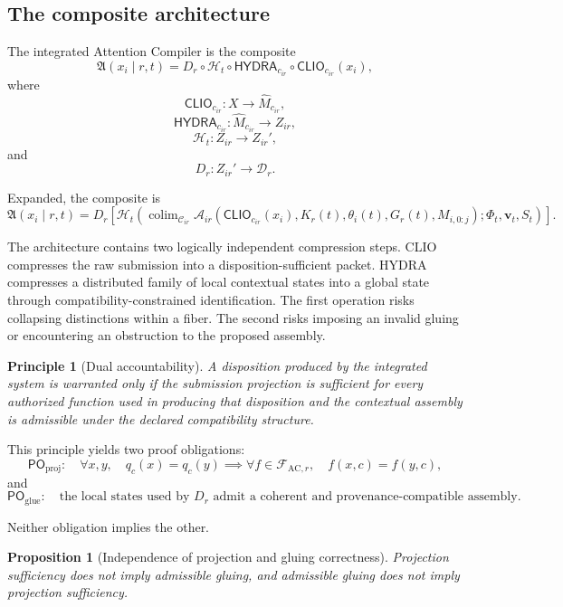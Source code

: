 \documentclass[11pt]{article}
\newtheorem{proposition}[definition]{Proposition}
\newtheorem{principle}[definition]{Principle}
\theoremstyle{definition}
\DeclareMathOperator{\colim}{colim}
\newcommand{\F}{\mathcal{F}}
\newcommand{\C}{\mathcal{C}}
\newcommand{\A}{\mathcal{A}}
\newcommand{\D}{\mathcal{D}}
\newcommand{\Hh}{\mathcal{H}}
\newcommand{\FieldPhi}{\Phi}
\newcommand{\FieldV}{\mathbf{v}}
\newcommand{\FieldS}{S}
\newcommand{\AC}{\mathfrak{A}}
\newcommand{\CLIO}{\mathsf{CLIO}}
\newcommand{\HYDRA}{\mathsf{HYDRA}}
\begin{document}
\subsection{The composite architecture}

The integrated Attention Compiler is the composite
\[
\AC(x_i\mid r,t)
=
D_r
\circ
\Hh_t
\circ
\HYDRA_{c_{ir}}
\circ
\CLIO_{c_{ir}}
(x_i),
\]
where
\[
\CLIO_{c_{ir}}:
X\to \widehat M_{c_{ir}},
\]
\[
\HYDRA_{c_{ir}}:
\widehat M_{c_{ir}}
\to Z_{ir},
\]
\[
\Hh_t:
Z_{ir}
\to Z_{ir}',
\]
and
\[
D_r:
Z_{ir}'
\to\D_r.
\]

Expanded, the composite is
\[
\AC(x_i\mid r,t)
=
D_r\!\left[
\Hh_t
\left(
\colim_{\C_{ir}}
\A_{ir}
\left(
\CLIO_{c_{ir}}(x_i),
K_r(t),
\theta_i(t),
G_r(t),
M_{i,0:j}
\right);
\FieldPhi_t,\FieldV_t,\FieldS_t
\right)
\right].
\]

The architecture contains two logically independent compression steps. CLIO compresses the raw submission into a disposition-sufficient packet. HYDRA compresses a distributed family of local contextual states into a global state through compatibility-constrained identification. The first operation risks collapsing distinctions within a fiber. The second risks imposing an invalid gluing or encountering an obstruction to the proposed assembly.

\begin{principle}[Dual accountability]
A disposition produced by the integrated system is warranted only if the submission projection is sufficient for every authorized function used in producing that disposition and the contextual assembly is admissible under the declared compatibility structure.
\end{principle}

This principle yields two proof obligations:
\[
\mathsf{PO}_{\mathrm{proj}}:
\quad
\forall x,y,
\quad
q_c(x)=q_c(y)
\implies
\forall f\in\F_{\mathrm{AC},r},
\quad
f(x,c)=f(y,c),
\]
and
\[
\mathsf{PO}_{\mathrm{glue}}:
\quad
\text{the local states used by }D_r
\text{ admit a coherent and provenance-compatible assembly}.
\]

Neither obligation implies the other.

\begin{proposition}[Independence of projection and gluing correctness]
Projection sufficiency does not imply admissible gluing, and admissible gluing does not imply projection sufficiency.
\end{proposition}
\end{document}
